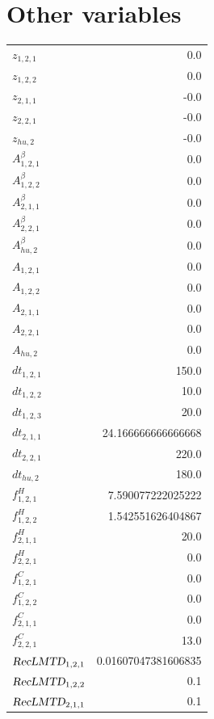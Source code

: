 \documentclass{article}%
\makeatletter
\let\mcnewpage=\newpage%
\newcommand{\TrickSupertabularIntoMulticols}{%
\renewcommand\newpage{%
\if@firstcolumn%
\hrule width\linewidth height0pt%
\columnbreak%
\else%
\mcnewpage%
\fi%
}%
}%
\makeatother
\begin{document}
\section{Other variables}%
\thispagestyle{plain}%
\begin{multicols*}{3}%
\TrickSupertabularIntoMulticols%
%
\begin{supertabular}{lr}%
	$z_{1,2,1}$ & 0.0 \\%
	$z_{1,2,2}$ & 0.0 \\%
	$z_{2,1,1}$ & -0.0 \\%
	$z_{2,2,1}$ & -0.0 \\%
	$z_{hu,2}$ & -0.0 \\%
	$A_{1,2,1}^{\beta}$ & 0.0 \\%
	$A_{1,2,2}^{\beta}$ & 0.0 \\%
	$A_{2,1,1}^{\beta}$ & 0.0 \\%
	$A_{2,2,1}^{\beta}$ & 0.0 \\%
	$A_{hu,2}^{\beta}$ & 0.0 \\%
	$A_{1,2,1}$ & 0.0 \\%
	$A_{1,2,2}$ & 0.0 \\%
	$A_{2,1,1}$ & 0.0 \\%
	$A_{2,2,1}$ & 0.0 \\%
	$A_{hu,2}$ & 0.0 \\%
	$dt_{1,2,1}$ & 150.0 \\%
	$dt_{1,2,2}$ & 10.0 \\%
	$dt_{1,2,3}$ & 20.0 \\%
	$dt_{2,1,1}$ & 24.166666666666668 \\%
	$dt_{2,2,1}$ & 220.0 \\%
	$dt_{hu,2}$ & 180.0 \\%
	$f_{1,2,1}^{H}$ & 7.590077222025222 \\%
	$f_{1,2,2}^{H}$ & 1.542551626404867 \\%
	$f_{2,1,1}^{H}$ & 20.0 \\%
	$f_{2,2,1}^{H}$ & 0.0 \\%
	$f_{1,2,1}^{C}$ & 0.0 \\%
	$f_{1,2,2}^{C}$ & 0.0 \\%
	$f_{2,1,1}^{C}$ & 0.0 \\%
	$f_{2,2,1}^{C}$ & 13.0 \\%
	$\textsl{RecLMTD}_{1,2,1}$ & 0.01607047381606835 \\%
	$\textsl{RecLMTD}_{1,2,2}$ & 0.1 \\%
	$\textsl{RecLMTD}_{2,1,1}$ & 0.1 \\%

\end{supertabular}
\end{multicols*}
\end{document}
